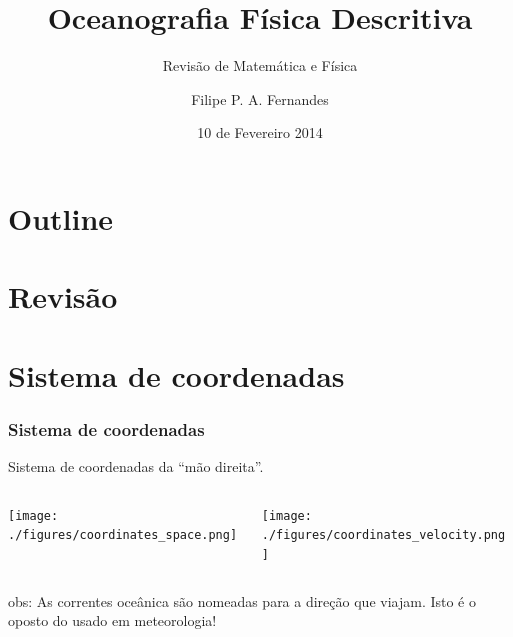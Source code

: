 \title[Aula 01]{Oceanografia Física Descritiva}
\subtitle{Revisão de Matemática e Física}
\author[Filipe Fernandes]{Filipe P. A. Fernandes}
\date[Fevereiro 2014]{10 de Fevereiro 2014}




\begin{frame}[plain]
  \titlepage
\end{frame}

\section*{Outline}
\begin{frame}
\tableofcontents
\end{frame}

\section{Revisão}
\section{Sistema de coordenadas}

\begin{frame}
\frametitle{Sistema de coordenadas}
  \begin{block}{}
    Sistema de coordenadas da ``mão direita''.
  \end{block}

  \vspace{0.3cm}

  \begin{columns}
    \begin{column}{0.5\textwidth}
      \texttt{[image: ./figures/coordinates\_space.png]}
    \end{column}

    \begin{column}{0.5\textwidth}
      \texttt{[image: ./figures/coordinates\_velocity.png]}
    \end{column}
  \end{columns}

  \vspace{0.5cm} \pause

  \scriptsize{obs: As correntes oceânica são nomeadas para a direção que
              viajam.  Isto é o oposto do usado em meteorologia!}
\end{frame}


